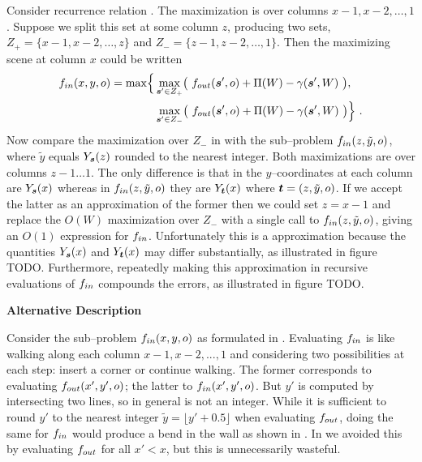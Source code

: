 Consider recurrence relation . The
maximization is over columns $x-1,x-2,\ldots,1$. Suppose we split this
set at some column $z$, producing two sets, $Z_+=\{x-1,x-2,\ldots,z\}$
and $Z_-=\{z-1,z-2,\ldots,1\}$. Then the maximizing scene at column
$x$ could be written
\begin{equation}
  \label{eq:fin-split}
  \begin{split}
    \SubProbIN(x,y,\WallOrient) =
    \max\Bigl\{
      &\max_{\State'\in Z_+}\limits \bigl(~
        \SubProbOUT(\State',\WallOrient)
        + \WallPayoff(\Wall) - \CornerPenalty(\State',\Wall)~
      \bigr),\\
      &\max_{\State'\in Z_-}\limits \bigl(~
        \SubProbOUT(\State',\WallOrient)
        + \WallPayoff(\Wall) - \CornerPenalty(\State',\Wall)~
      \bigr)
    \Bigr\} ~.
  \end{split}
\end{equation}
Now compare the maximization over $Z_-$ in  with the
sub--problem $\SubProbIN(z,\tilde{y},o)$, where $\tilde{y}$ equals
$Y_{\State}(z)$ rounded to the nearest integer. Both maximizations are
over columns $z-1 \ldots 1$. The only difference is that in
 the $y$--coordinates at each column are
$Y_{\State}(x)$ whereas in $\SubProbIN(z,\tilde{y},o)$ they are
$Y_{\OtherState}(x)$ where $\OtherState=(z,\tilde{y},o)$. If we accept
the latter as an approximation of the former then we could set $z=x-1$
and replace the $O(W)$ maximization over $Z_-$ with a single call to
$\SubProbIN(z,\tilde{y},\WallOrient)$, giving an $O(1)$ expression for
$\SubProbIN$. Unfortunately this is a approximation because the
quantities $Y_{\State}(x)$ and $Y_{\OtherState}(x)$ may differ
substantially, as illustrated in figure TODO. Furthermore, repeatedly
making this approximation in recursive evaluations of $\SubProbIN$
compounds the errors, as illustrated in figure TODO.

\textbf{Alternative Description}

Consider the sub--problem $\SubProbIN(x,y,\WallOrient)$ as formulated
in . Evaluating $\SubProbIN$ is like
walking along each column $x-1,x-2,...,1$ and considering two
possibilities at each step: insert a corner or continue walking. The
former corresponds to evaluating $\SubProbOUT(x',y',\WallOrient)$; the
latter to $\SubProbIN(x',y',\WallOrient)$. But $y'$ is computed by
intersecting two lines, so in general is not an integer. While it
is sufficient to round $y'$ to the nearest integer $\tilde{y}=\lfloor
y'+0.5 \rfloor$ when evaluating $\SubProbOUT$, doing the same for
$\SubProbIN$ would produce a bend in the wall as shown in
. In  we avoided this
by evaluating $\SubProbOUT$ for all $x'<x$, but this is unnecessarily
wasteful.

